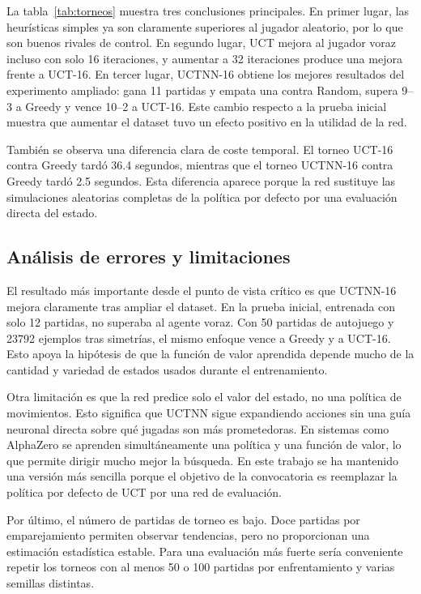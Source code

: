 \documentclass[conference,a4paper]{IEEEtran}
\begin{document}
La tabla~\ref{tab:torneos} muestra tres conclusiones principales. En primer
lugar, las heurísticas simples ya son claramente superiores al jugador aleatorio,
por lo que son buenos rivales de control. En segundo lugar, UCT mejora al jugador
voraz incluso con solo 16 iteraciones, y aumentar a 32 iteraciones produce una
mejora frente a UCT-16. En tercer lugar, UCTNN-16 obtiene los mejores resultados
del experimento ampliado: gana 11 partidas y empata una contra Random, supera
9--3 a Greedy y vence 10--2 a UCT-16. Este cambio respecto a la prueba inicial
muestra que aumentar el dataset tuvo un efecto positivo en la utilidad de la red.

También se observa una diferencia clara de coste temporal. El torneo UCT-16
contra Greedy tardó 36.4 segundos, mientras que el torneo UCTNN-16 contra Greedy
tardó 2.5 segundos. Esta diferencia aparece porque la red sustituye las
simulaciones aleatorias completas de la política por defecto por una evaluación
directa del estado.

\subsection{Análisis de errores y limitaciones}

El resultado más importante desde el punto de vista crítico es que UCTNN-16
mejora claramente tras ampliar el dataset. En la prueba inicial, entrenada con
solo 12 partidas, no superaba al agente voraz. Con 50 partidas de autojuego y
23792 ejemplos tras simetrías, el mismo enfoque vence a Greedy y a UCT-16. Esto
apoya la hipótesis de que la función de valor aprendida depende mucho de la
cantidad y variedad de estados usados durante el entrenamiento.

Otra limitación es que la red predice solo el valor del estado, no una política
de movimientos. Esto significa que UCTNN sigue expandiendo acciones sin una guía
neuronal directa sobre qué jugadas son más prometedoras. En sistemas como
AlphaZero se aprenden simultáneamente una política y una función de valor, lo
que permite dirigir mucho mejor la búsqueda. En este trabajo se ha mantenido una
versión más sencilla porque el objetivo de la convocatoria es reemplazar la
política por defecto de UCT por una red de evaluación.

Por último, el número de partidas de torneo es bajo. Doce partidas por
emparejamiento permiten observar tendencias, pero no proporcionan una estimación
estadística estable. Para una evaluación más fuerte sería conveniente repetir
los torneos con al menos 50 o 100 partidas por enfrentamiento y varias semillas
distintas.
\end{document}
